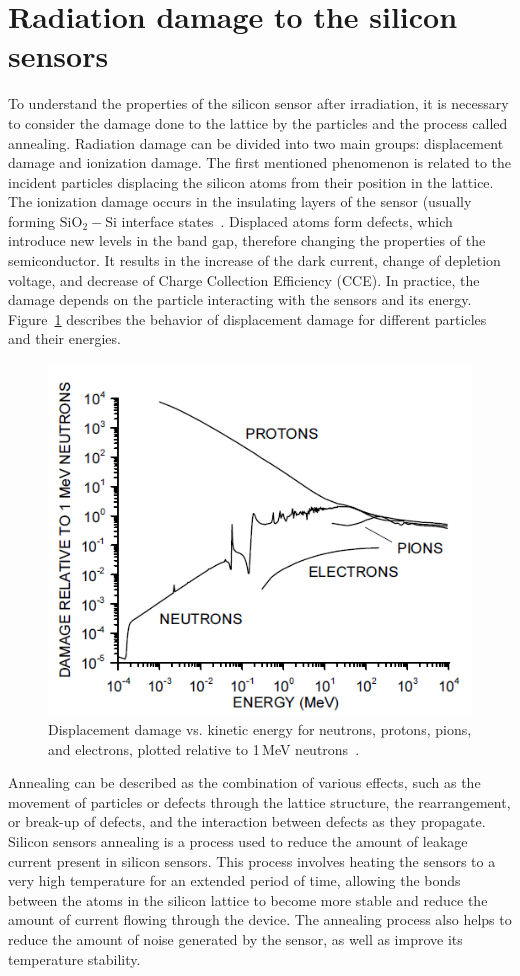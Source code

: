 \section{Radiation damage to the silicon sensors}
\label{silicon_damage}
To understand the properties of the silicon sensor after irradiation, it is necessary to consider the damage done to the lattice by the particles and the process called annealing. Radiation damage can be divided into two main groups: displacement damage and ionization damage. The first mentioned phenomenon is related to the incident particles displacing the silicon atoms from their position in the lattice. The ionization damage occurs in the insulating layers of the sensor (usually forming $\mathrm{SiO_{2}-Si}$ interface states~\cite{Moll:1999kv}. Displaced atoms form defects, which introduce new levels in the band gap, therefore changing the properties of the semiconductor. It results in the increase of the dark current, change of depletion voltage, and decrease of Charge Collection Efficiency (\gls{CCE}). In practice, the damage depends on the particle interacting with the sensors and its energy. Figure~\ref{fig_niel_si} describes the behavior of displacement damage for different particles and their energies.  
\begin{figure}[!h]
\centering
\includegraphics[width=0.7\columnwidth]{Chapter2/images/displacement_damage.png}
\caption{Displacement damage vs. kinetic energy for neutrons, protons, pions, and electrons,
plotted relative to 1\,MeV neutrons~\cite{Spieler}.}
\label{fig_niel_si}
\end{figure}

Annealing can be described as the combination of various effects, such as the movement of particles or defects through the lattice structure, the rearrangement, or break-up of defects, and the interaction between defects as they propagate. Silicon sensors annealing is a process used to reduce the amount of leakage current present in silicon sensors. This process involves heating the sensors to a very high temperature for an extended period of time, allowing the bonds between the atoms in the silicon lattice to become more stable and reduce the amount of current flowing through the device. The annealing process also helps to reduce the amount of noise generated by the sensor, as well as improve its temperature stability. \bigbreak

